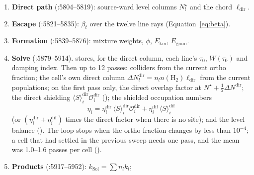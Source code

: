 \begin{enumerate}
\begin{itemize}
\begin{equation}
      \langle S\rangle^{\mathrm{dif}}_i = \frac{1}{\sum w}\sum_{g}\mathcal{O}_{i,g}
      \Bigl[w^{\mathrm{thin}}_{l,g}\,\langle S\rangle(0) + \sum_{\mathrm{bins}} w_{l,g,\mathrm{bin}}\,
      \langle S\rangle\bigl(\sigma_i N_{\mathrm{bin}}\bigr)\Bigr],
    \end{equation}
    each $\langle S\rangle$ averaged through the cell's own column
    $\sigma_i\Delta N^{\mathrm{iso}}_l$ by Equation~(\ref{eq:cellavg}).
  \end{itemize}
  The binning replaces each site's column by its bin centre (an error of at
  most $\pm0.05$\,dex in $N_l$) and each group's overlap by that at the group's
  mean columns. If there is diffuse light but no site (no dust on any of the
  twelve rays) the diffuse part rides the direct path (:5799--5802).
\item \textbf{Direct path} (:5804--5819): source-ward level columns
  $N^\star_l$ and the chord $\ell_{\mathrm{dir}}$.
\item \textbf{Escape} (:5821--5835): $\beta_t$ over the twelve line rays
  (Equation~\ref{eq:beta}).
\item \textbf{Formation} (:5839--5876): mixture weights, $\phi$, $E_{\mathrm{kin}}$,
  $E_{\mathrm{grain}}$.
\item \textbf{Solve} (:5879--5914).  stores, for the
  direct column, each line's $\tau_0$, $W(\tau_0)$ and damping index. Then up
  to 12 passes: colliders from the current ortho fraction; the cell's own
  direct column $\Delta N^{\mathrm{dir}}_l = n_l n(\mathrm{H_2})\ell_{\mathrm{dir}}$
  from the current populations; on the first pass only, the direct overlap factor at
  $N^\star+\frac12\Delta N^{\mathrm{dir}}$; the direct shielding
  $\langle S\rangle^{\mathrm{dir}}_i\mathcal{O}^{\mathrm{dir}}_i$
  (); the shielded occupation numbers
  \begin{equation}
    \eta_i = \eta^{\mathrm{dir}}_i\,\langle S\rangle^{\mathrm{dir}}_i\mathcal{O}^{\mathrm{dir}}_i
           + \eta^{\mathrm{dif}}_i\,\langle S\rangle^{\mathrm{dif}}_i
  \end{equation}
  (or $(\eta^{\mathrm{dir}}_i+\eta^{\mathrm{dif}}_i)$ times the direct factor
  when there is no site); and the level balance (). The loop stops
  when the ortho fraction changes by less than $10^{-4}$; a cell that had
  settled in the previous sweep needs one pass, and the mean was 1.0--1.6 passes
  per cell ().
\item \textbf{Products} (:5917--5952): $k_{\mathrm{Sol}}=\sum n_lk_l$;

\end{enumerate}
